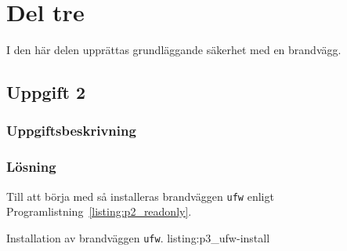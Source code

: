 %
%
%


\section{Del tre}
I den här delen upprättas grundläggande säkerhet med en brandvägg.


\subsection{Uppgift 2}
\subsubsection{Uppgiftsbeskrivning}


\subsubsection{Lösning}
Till att börja med så installeras brandväggen \texttt{ufw} enligt 
Programlistning~\ref{listing:p2_readonly}.

            {Installation av brandväggen \texttt{ufw}.}
            {listing:p3_ufw-install}

